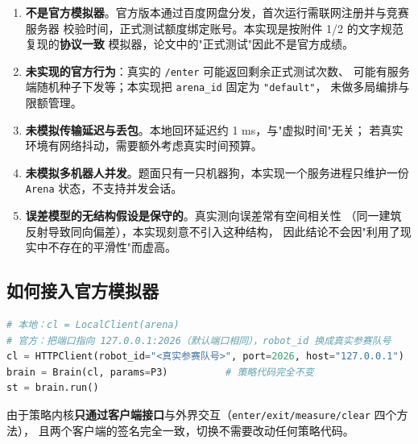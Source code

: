 \begin{enumerate}[leftmargin=1.8em]
  \item \textbf{不是官方模拟器}。官方版本通过百度网盘分发，首次运行需联网注册并与竞赛服务器
        校验时间，正式测试额度绑定账号。本实现是按附件 1/2 的文字规范复现的\textbf{协议一致}
        模拟器，论文中的"正式测试"因此不是官方成绩。
  \item \textbf{未实现的官方行为}：真实的 \texttt{/enter} 可能返回剩余正式测试次数、
        可能有服务端随机种子下发等；本实现把 \texttt{arena\_id} 固定为 \texttt{"default"}，
        未做多局编排与限额管理。
  \item \textbf{未模拟传输延迟与丢包}。本地回环延迟约 1 ms，与"虚拟时间"无关；
        若真实环境有网络抖动，需要额外考虑真实时间预算。
  \item \textbf{未模拟多机器人并发}。题面只有一只机器狗，本实现一个服务进程只维护一份
        \texttt{Arena} 状态，不支持并发会话。
  \item \textbf{误差模型的无结构假设是保守的}。真实测向误差常有空间相关性
        （同一建筑反射导致同向偏差），本实现刻意不引入这种结构，
        因此结论不会因"利用了现实中不存在的平滑性"而虚高。
\end{enumerate}

\subsection{如何接入官方模拟器}

\begin{lstlisting}[language=Python,caption={切换回官方模拟器只需改一行}]
# 本地：cl = LocalClient(arena)
# 官方：把端口指向 127.0.0.1:2026（默认端口相同），robot_id 换成真实参赛队号
cl = HTTPClient(robot_id="<真实参赛队号>", port=2026, host="127.0.0.1")
brain = Brain(cl, params=P3)          # 策略代码完全不变
st = brain.run()
\end{lstlisting}

由于策略内核\textbf{只通过客户端接口}与外界交互（\texttt{enter/exit/measure/clear} 四个方法），
且两个客户端的签名完全一致，切换不需要改动任何策略代码。


